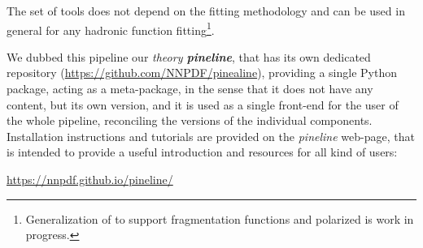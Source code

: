 The set of tools does not depend
on the \nnpdf fitting methodology and can be used in general for
any hadronic function fitting\footnote{
  Generalization of \pineappl to support fragmentation functions and polarized
  \pdfs is work in progress.
}.

We dubbed this pipeline our \textit{theory \textbf{pineline}}, that has its own
dedicated repository (\url{https://github.com/NNPDF/pinealine}), providing a
single Python package, acting as a meta-package, in the sense that it does not
have any content, but its own version, and it is used as a single front-end for
the user of the whole pipeline, reconciling the versions of the individual
components.
Installation instructions and tutorials are provided on the \textit{pineline}
web-page, that is intended to provide a useful introduction and resources for
all kind of users:
\begin{center}
  \url{https://nnpdf.github.io/pineline/}
\end{center}

